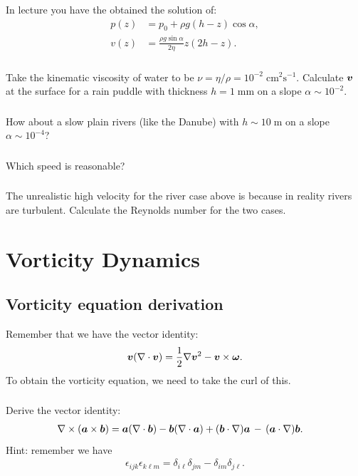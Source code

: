 \documentclass[11pt,letterpaper]{report}
\begin{document}
In lecture you have the obtained the solution of:
\begin{align}
    p(z) &= p_0+\rho g(h-z)\cos\alpha,\\
    v(z) &= \frac{\rho g\sin\alpha}{2\eta}z(2h-z).
\end{align}

\subsection{}
Take the kinematic viscosity of water to be $\nu = \eta/\rho = 10^{-2}\;\text{cm}^2\text{s}^{-1}$. Calculate $\boldsymbol{v}$ at the surface for a rain puddle with thickness $h = 1\;\text{mm}$ on a slope $\alpha\sim 10^{-2}$.

\subsection{}
How about a slow plain rivers (like the Danube) with $h \sim 10\;\text{m}$ on a slope $\alpha\sim 10^{-4}$?

\subsection{}
Which speed is reasonable?

\subsection{}
The unrealistic high velocity for the river case above is because in reality rivers are turbulent. Calculate the Reynolds number for the two cases.

\chapter{Vorticity Dynamics}
\section{Vorticity equation derivation}
Remember that we have the vector identity:
\begin{align}
    \boldsymbol{v}(\nabla\cdot\boldsymbol{v}) = \frac{1}{2}\nabla\boldsymbol{v}^2-\boldsymbol{v}\times\boldsymbol{\omega}.
\end{align}
To obtain the vorticity equation, we need to take the curl of this. 

\subsection{}
Derive the vector identity:
\begin{align}
    \nabla\times(\boldsymbol{a}\times\boldsymbol{b}) &= \boldsymbol{a}(\nabla \cdot \boldsymbol{b}) - \boldsymbol{b}(\nabla \cdot \boldsymbol{a})+(\boldsymbol{b} \cdot \nabla) \boldsymbol{a} \,-\, (\boldsymbol{a} \cdot \nabla) \boldsymbol{b}.
\end{align}
Hint: remember we have
\begin{align}
    \epsilon_{ijk}\epsilon_{k\ell m} = \delta_{i\ell}\delta_{jm}-\delta_{im}\delta_{j\ell}.
\end{align}
\end{document}
